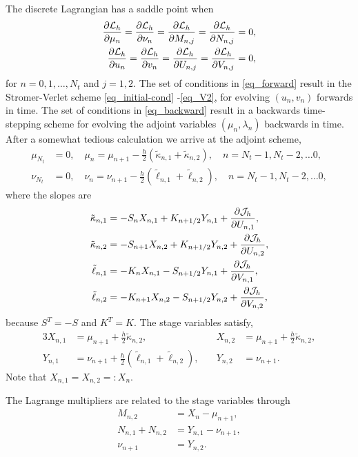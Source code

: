 \documentclass[11pt]{article}
\begin{document}
The discrete Lagrangian has a saddle point when
\begin{align}
  \frac{\partial{\cal L}_h}{\partial \mu_n} =
  \frac{\partial{\cal L}_h}{\partial \nu_n} =
  \frac{\partial{\cal L}_h}{\partial M_{n,j}} =
  \frac{\partial{\cal L}_h}{\partial N_{n,j}} &= 0,\label{eq_forward}\\
  \frac{\partial{\cal L}_h}{\partial u_n} =
  \frac{\partial{\cal L}_h}{\partial v_n} =
  \frac{\partial{\cal L}_h}{\partial U_{n,j}} =
  \frac{\partial{\cal L}_h}{\partial V_{n,j}} &= 0,\label{eq_backward}
\end{align}
for $n=0,1,\ldots,N_t$ and $j=1,2$. The set of conditions in \eqref{eq_forward} result in the
Stromer-Verlet scheme \eqref{eq_initial-cond} -\eqref{eq_V2}, for evolving $(u_n, v_n)$ forwards in
time. The set of conditions in \eqref{eq_backward} result in a backwards time-stepping scheme
for evolving the adjoint variables $(\mu_n, \lambda_n)$ backwards in time. After a
somewhat tedious calculation we arrive at the adjoint scheme,
\begin{align}
  \mu_{N_t} &= 0,\quad \mu_n = \mu_{n+1} - \frac{h}{2} \left(\tilde\kappa_{n,1} +
  \tilde\kappa_{n,2}\right),\quad n=N_t -1, N_t - 2, \ldots 0,\\
  \nu_{N_t} &= 0,\quad \nu_{n} = \nu_{n+1} - \frac{h}{2} \left( \tilde\ell_{n,1} + \tilde\ell_{n,2} \right),\quad n=N_t -1, N_t -2, \ldots 0,
\end{align}
where the slopes are
\begin{align}
\tilde\kappa_{n,1} &= -S_n X_{n,1} + K_{n+1/2} Y_{n,1} + \frac{\partial {\cal J}_h}{\partial U_{n,1}} ,\\
\tilde\kappa_{n,2} &= -S_{n+1} X_{n,2} + K_{n+1/2} Y_{n,2}  + \frac{\partial {\cal J}_h}{\partial U_{n,2}},\\
\tilde\ell_{n,1} &= -K_{n} X_{n,1} - S_{n+1/2} Y_{n,1}  + \frac{\partial {\cal J}_h}{\partial V_{n,1}},\\
\tilde\ell_{n,2} &= -K_{n+1} X_{n,2} - S_{n+1/2} Y_{n,2}  + \frac{\partial {\cal J}_h}{\partial V_{n,2}},
\end{align}
because $S^T = -S$ and $K^T = K$. The stage variables satisfy,
\begin{alignat}{3}
  X_{n,1} &= \mu_{n+1} + \frac{h}{2} \tilde\kappa_{n,2},\quad
  &X_{n,2} & = \mu_{n+1} + \frac{h}{2} \tilde\kappa_{n,2},\\
  Y_{n,1} &= \nu_{n+1} +\frac{h}{2} \left( \tilde\ell_{n,1} + \tilde\ell_{n,2} \right),\quad
  &Y_{n,2} &= \nu_{n+1}.
\end{alignat}
Note that $X_{n,1}=X_{n,2} =: X_n$.

The Lagrange multipliers are related to the stage variables through
\begin{align}
  M_{n,2} &= X_{n} - \mu_{n+1},\label{eq_MX}\\
  N_{n,1} + N_{n,2} &= Y_{n,1} - \nu_{n+1},\label{eq_NY1}\\
  \nu_{n+1} &= Y_{n,2}.\label{eq_NY2}
\end{align}
\end{document}
